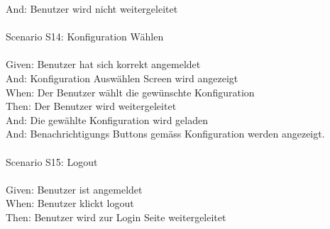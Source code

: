 \begin{tabbing}
    And: \> \> \>  Benutzer wird nicht weitergeleitet\\
    \\
    Scenario S14: \> \> \>  Konfiguration Wählen\\ \\
    Given: \> \> \>  Benutzer hat sich korrekt angemeldet\\
    And: \> \> \>    Konfiguration Auswählen Screen wird angezeigt\\
    When: \> \> \>   Der Benutzer wählt die gewünschte Konfiguration\\
    Then: \> \> \>   Der Benutzer wird weitergeleitet\\
    And: \> \> \>    Die gewählte Konfiguration wird geladen\\
    And: \> \> \>    Benachrichtigungs Buttons gemäss Konfiguration werden angezeigt.\\ \\

    Scenario S15: \>  \> \> Logout\\ \\
    Given: \> \> \>  Benutzer ist angemeldet\\
    When: \> \> \>   Benutzer klickt logout\\
    Then: \> \> \>  Benutzer wird zur Login Seite weitergeleitet\\
\end{tabbing}

\clearpage

